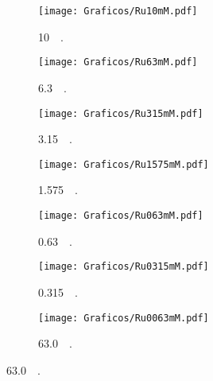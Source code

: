 		    	\begin{figure}[th]
		   	     \begin{subfigure}[t]{0.325\textwidth}
		        	\texttt{[image: Graficos/Ru10mM.pdf]}
		        	\vspace*{-0.40cm}\caption{\aminorutenio\space \SI{10}{\milli\Molar}.}
		         	\label{fig:Ventana_Ru1mM}
		     		\end{subfigure}
		   	    \begin{subfigure}[t]{0.325\textwidth}
		        	\texttt{[image: Graficos/Ru63mM.pdf]}
		       		\vspace*{-0.40cm}\caption{\aminorutenio\space \SI{6.3}{\milli\Molar}.}
		         	\label{fig:Ventana_Ru63mM}
		     		\end{subfigure}
	     		\begin{subfigure}[t]{0.325\textwidth}
		        	\texttt{[image: Graficos/Ru315mM.pdf]}
		       		\vspace*{-0.40cm}\caption{\aminorutenio\space \SI{3.15}{\milli\Molar}.}
		         	\label{fig:Ventana_Ru315mM}
		     		\end{subfigure}
	     		\begin{subfigure}[t]{0.325\textwidth}
		        	\texttt{[image: Graficos/Ru1575mM.pdf]}
		       		\vspace*{-0.40cm}\caption{\aminorutenio\space \SI{1.575}{\milli\Molar}.}
		         	\label{fig:Ru_0315mM}
		     		\end{subfigure}
	 	   	   	\begin{subfigure}[t]{0.325\textwidth}
		        	\texttt{[image: Graficos/Ru063mM.pdf]}
		       		\vspace*{-0.40cm}\caption{\aminorutenio\space \SI{0.63}{\milli\Molar}.}
		         	\label{fig:Ventana_Ru1mM}
		     		\end{subfigure}
	     		\begin{subfigure}[t]{0.325\textwidth}
		        	\texttt{[image: Graficos/Ru0315mM.pdf]}
		       		\vspace*{-0.40cm}\caption{\aminorutenio\space \SI{0.315}{\milli\Molar}.}
		         	\label{fig:Ru_0mM}
		     		\end{subfigure}
		     	 \begin{subfigure}[t]{0.325\textwidth}
		        	\texttt{[image: Graficos/Ru0063mM.pdf]}
		       		\vspace*{-0.40cm}\caption{\aminorutenio\space \SI{63,0}{\micro\Molar}.}

\end{subfigure}
\end{figure}
